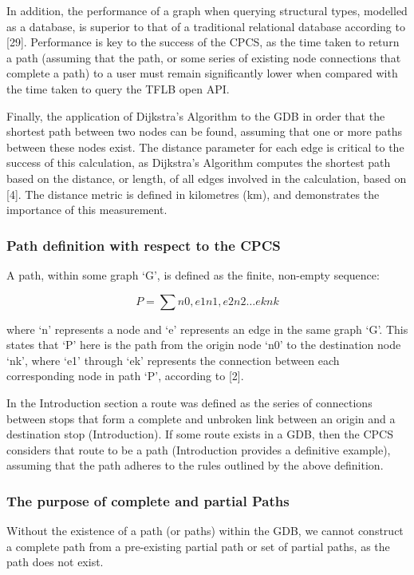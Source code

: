 \documentclass[12pt]{article}   	%
\begin{document}
In addition, the performance of a graph when querying structural types, modelled as a database, is superior to that of a traditional relational database according to [29]. Performance is key to the success of the CPCS, as the time taken to return a path (assuming that the path, or some series of existing node connections that complete a path) to a user must remain significantly lower when compared with the time taken to query the TFLB open API.

Finally, the application of Dijkstra’s Algorithm to the GDB in order that the shortest path between two nodes can be found, assuming that one or more paths between these nodes exist. The distance parameter for each edge is critical to the success of this calculation, as Dijkstra’s Algorithm computes the shortest path based on the distance, or length, of all edges involved in the calculation, based on [4]. The distance metric is defined in kilometres (km), and demonstrates the importance of this measurement.

\subsubsection{Path definition with respect to the CPCS}
A path, within some graph ‘G’, is defined as the finite, non-empty sequence:

\hfill
\noindent
\[ P = \sum n0, e1n1, e2n2 … eknk \]

\noindent
where ‘n’ represents a node and ‘e’ represents an edge in the same graph ‘G’. This states that ‘P’ here is the path from the origin node ‘n0’ to the destination node ‘nk’, where ‘e1’ through ‘ek’ represents the connection between each corresponding node in path ‘P’, according to [2].

In the Introduction section a route was defined as the series of connections between stops that form a complete and unbroken link between an origin and a destination stop (Introduction). If some route exists in a GDB, then the CPCS considers that route to be a path (Introduction provides a definitive example), assuming that the path adheres to the rules outlined by the above definition.

\newpage

\subsubsection{The purpose of complete and partial Paths}
Without the existence of a path (or paths) within the GDB, we cannot construct a complete path from a pre-existing partial path or set of partial paths, as the path does not exist.
\end{document}
